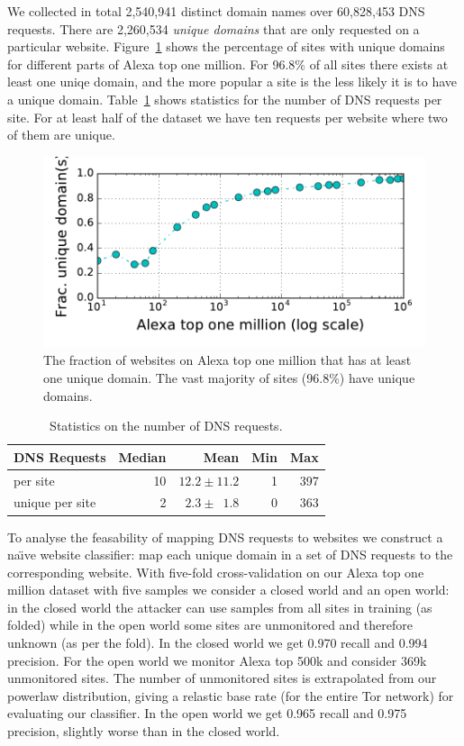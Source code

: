 We collected in total 2,540,941 distinct domain names over 60,828,453 DNS
requests. There are 2,260,534 \emph {unique domains} that are only requested on
a particular website. Figure~\ref{fig:unique-domains} shows the percentage of
sites with unique domains for different parts of Alexa top one million.
For 96.8\% of all sites there exists at least one uniqe domain, and the more
popular a site is the less likely it is to have a unique domain.
Table~\ref{tab:dns-requests} shows statistics for the number of DNS requests per
site. For at least half of the dataset we have ten requests per website where
two of them are unique.

\begin{figure}[t]
	\centering
	\includegraphics[width=0.7\linewidth]{figures/dns-unique-domains.pdf}
	\caption{The fraction of websites on Alexa top one million that has at least
	one unique domain. The vast majority of sites (96.8\%) have unique domains.}
	\label{fig:unique-domains}
\end{figure}

\begin{table}[t]
	\centering
	\caption{Statistics on the number of DNS requests.}
	\begin{tabular}{l r r r r}
	\toprule
	\textbf{DNS Requests} & \textbf{Median} & \textbf{Mean} & \textbf{Min} & \textbf{Max} \\
	\midrule
	per site & 10 & $12.2\pm11.2$ & 1 & 397 \\
	unique per site & 2 & $2.3\pm\phantom{0}1.8$ & 0 & 363 \\
	\bottomrule
	\end{tabular}
	\label{tab:dns-requests}
\end{table}

To analyse the feasability of mapping DNS requests to websites we construct a
na\"{\i}ve website classifier: map each unique domain in a set of DNS requests
to the corresponding website.
With five-fold cross-validation on our Alexa top one million dataset with five
samples we consider a closed world and an open world: in the closed world the
attacker can use samples from all sites in training (as folded) while in the
open world some sites are unmonitored and therefore unknown (as per the fold).
In the closed world we get 0.970 recall and 0.994 precision.
For the open world we monitor Alexa top 500k and consider 369k unmonitored
sites. The number of unmonitored sites is extrapolated from our powerlaw
distribution, giving a relastic base rate (for the entire Tor network) for
evaluating our classifier.
In the open world we get 0.965 recall and 0.975 precision, slightly
worse than in the closed world.

